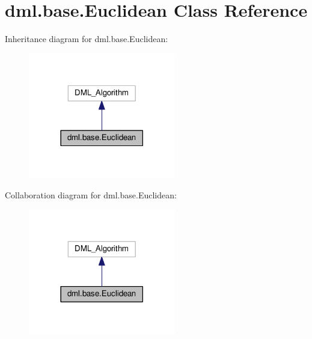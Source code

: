 \hypertarget{classdml_1_1base_1_1Euclidean}{}\section{dml.\+base.\+Euclidean Class Reference}
\label{classdml_1_1base_1_1Euclidean}


Inheritance diagram for dml.\+base.\+Euclidean\+:\nopagebreak
\begin{figure}[H]
\begin{center}
\leavevmode
\includegraphics[width=182pt]{classdml_1_1base_1_1Euclidean__inherit__graph}
\end{center}
\end{figure}


Collaboration diagram for dml.\+base.\+Euclidean\+:\nopagebreak
\begin{figure}[H]
\begin{center}
\leavevmode
\includegraphics[width=182pt]{classdml_1_1base_1_1Euclidean__coll__graph}
\end{center}
\end{figure}
